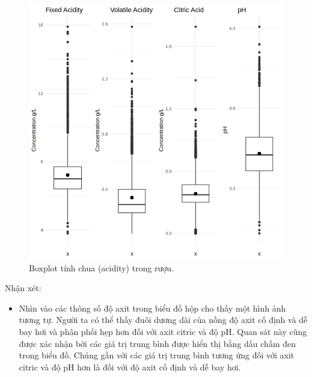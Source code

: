 \begin{figure}[H]
    \centering
    \includegraphics[width=0.75\columnwidth]{wine_colors/wine_acidity_boxplot.png}
    \caption{Boxplot tính chua (acidity) trong rượu.}
    \label{fig:wine_acidity_boxplot}
\end{figure}
Nhận xét:
\begin{itemize}
    \item Nhìn vào các thông số độ axit trong biểu đồ hộp cho thấy một hình ảnh tương tự. Người ta có thể thấy đuôi dương dài của nồng độ axit cố định và dễ bay hơi và phân phối hẹp hơn đối với axit citric và độ pH. Quan sát này cũng được xác nhận bởi các giá trị trung bình được hiển thị bằng dấu chấm đen trong biểu đồ. Chúng gần với các giá trị trung bình tương ứng đối với axit citric và độ pH hơn là đối với độ axit cố định và dễ bay hơi.
\end{itemize}

